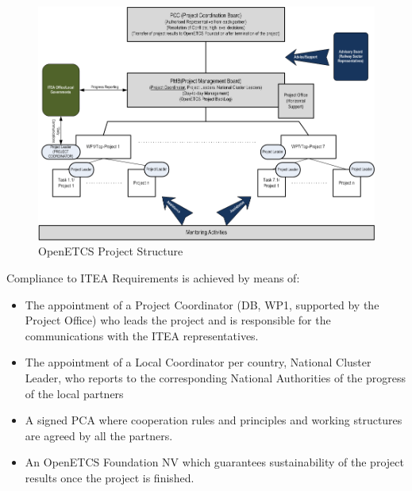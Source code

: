 \documentclass{template/openetcs_article}
\begin{document}
\begin{figure}[H]
\centering
\includegraphics[scale=0.6]{./figures/project_structure.PNG}
\caption{OpenETCS Project Structure}
\end{figure}

Compliance to ITEA Requirements is achieved by means of:
\begin{itemize}
\item The appointment of a Project Coordinator (DB, WP1, supported by the Project Office) who leads the project and is responsible for the communications with the ITEA representatives. 
\item The appointment of a Local Coordinator per country, National Cluster Leader, who reports to the corresponding National Authorities of the progress of the local partners
\item A signed PCA where cooperation rules and principles and working structures are agreed by all the partners.
\item An OpenETCS Foundation NV which guarantees sustainability of the project results once the project is finished.
\end{itemize}
\end{document}
